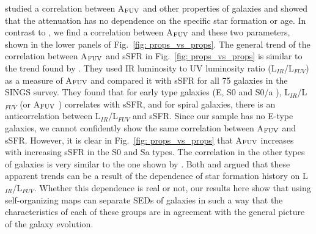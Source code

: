          studied a correlation between A$_{\rm {FUV}}$ and other properties of galaxies and showed that the attenuation has no dependence on the specific star formation or age.
        In contrast to , we find a correlation between A$_{\rm {FUV}}$ and these two parameters, shown in the lower panels of Fig.~\ref{fig: props_vs_props}.
        The general trend of the correlation between A$_{\rm {FUV}}$ and sSFR in Fig.~\ref{fig: props_vs_props} is similar to the trend found by \cite{Dale07}.
        They used IR luminosity to UV luminosity ratio (L$_{IR}$/L$_{FUV}$) as a measure of A$_{\rm {FUV}}$ and compared it with sSFR for all 75 galaxies in the SINGS survey.
        They found that for early type galaxies (E, S0 and S0/a ), L$_{IR}$/L$_{FUV}$ (or A$_{\rm {FUV}}$ ) correlates with sSFR, and for spiral galaxies, there is an anticorrelation between L$_{IR}$/L$_{FUV}$ and sSFR.
       Since our sample has no E-type galaxies, we cannot confidently show the same correlation between A$_{\rm {FUV}}$ and sSFR. 
        However, it is clear in Fig.~\ref{fig: props_vs_props} that A$_{\rm {FUV}}$ increases with increasing sSFR in the S0 and Sa types.
        The correlation in the other types of galaxies is very similar to the one shown by \cite{Dale07}.
        Both \cite{Dale07} and  argued that these apparent trends can be a result of the dependence of star formation history on L$_{IR}$/L$_{FUV}$.
        Whether this dependence is real or not, our results here show that using self-organizing maps can separate SEDs of galaxies in such a way that the characteristics of each of these groups are in agreement with the general picture of the galaxy evolution.
        
        
